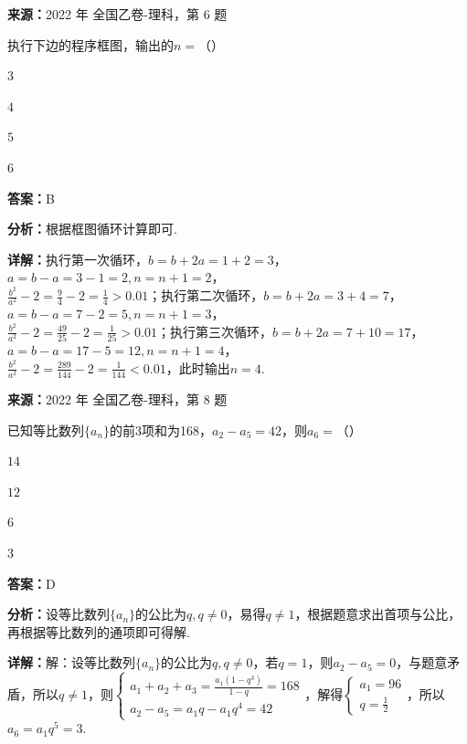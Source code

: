 \begin{question}[points=5]
\textbf{来源：}2022 年 全国乙卷-理科，第 6 题\par
执行下边的程序框图，输出的$n =$（\qquad）
\begin{choices}
  \item $3$
  \item $4$
  \item $5$
  \item $6$
\end{choices}
\begin{solution}
\textbf{答案：}B

\textbf{分析：}根据框图循环计算即可.

\textbf{详解：}执行第一次循环，$b = b + 2a = 1 + 2 = 3$，\\$a = b - a = 3 - 1 = 2, n = n + 1 = 2$，\\$\frac{b^2}{a^2} - 2 = \frac{9}{4} - 2 = \frac{1}{4} > 0.01$；执行第二次循环，$b = b + 2a = 3 + 4 = 7$，\\$a = b - a = 7 - 2 = 5, n = n + 1 = 3$，\\$\frac{b^2}{a^2} - 2 = \frac{49}{25} - 2 = \frac{1}{25} > 0.01$；执行第三次循环，$b = b + 2a = 7 + 10 = 17$，\\$a = b - a = 17 - 5 = 12, n = n + 1 = 4$，\\$\frac{b^2}{a^2} - 2 = \frac{289}{144} - 2 = \frac{1}{144} < 0.01$，此时输出$n=4$.
\end{solution}
\end{question}

\begin{question}[points=5]
\textbf{来源：}2022 年 全国乙卷-理科，第 8 题\par
已知等比数列$\{a_n\}$的前3项和为168，$a_2 - a_5 = 42$，则$a_6 =$（\qquad）
\begin{choices}
  \item $14$
  \item $12$
  \item $6$
  \item $3$
\end{choices}
\begin{solution}
\textbf{答案：}D

\textbf{分析：}设等比数列$\{a_n\}$的公比为$q, q\neq0$，易得$q\neq1$，根据题意求出首项与公比，再根据等比数列的通项即可得解.

\textbf{详解：}解：设等比数列$\{a_n\}$的公比为$q, q\neq0$，若$q=1$，则$a_2-a_5=0$，与题意矛盾，所以$q\neq1$，则$\begin{cases} a_1+a_2+a_3 = \frac{a_1(1-q^3)}{1-q} = 168 \\ a_2 - a_5 = a_1q - a_1q^4 = 42 \end{cases}$，解得$\begin{cases} a_1=96 \\ q=\frac{1}{2} \end{cases}$，所以$a_6 = a_1q^5 = 3$.
\end{solution}
\end{question}

